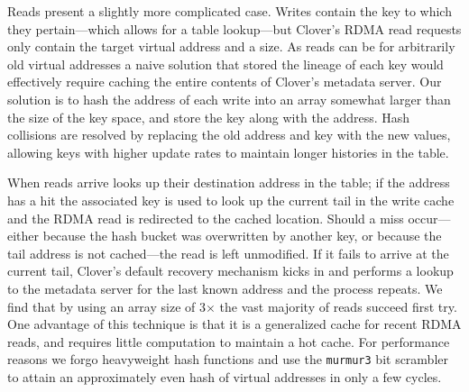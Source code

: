 Reads present a slightly more complicated case. Writes contain the key
to which they pertain---which allows for a table lookup---but Clover's
RDMA read requests only contain the target virtual address and a size.
As reads can be for arbitrarily old virtual addresses a naive solution
that stored the lineage of each key would effectively require
caching the entire contents of Clover's metadata server.  Our solution
is to hash the address of each write into an array somewhat larger than
the size of the key space, and store the key along with the address.
Hash collisions are resolved by replacing the old address and key with
the new values, allowing keys with higher update rates to maintain
longer histories in the table. 

When reads arrive {\sword} looks up their destination address in the
table; if the address has a hit the associated key is used to look up
the current tail in the write cache and the RDMA read is redirected to
the cached location.  Should a miss occur---either because the hash
bucket was overwritten by another key, or because the tail address is
not cached---the read is left unmodified.  If it fails to arrive at
the current tail, Clover's default recovery mechanism kicks in and
performs a lookup to the metadata server for the last known address
and the process repeats. We find that by using an array size of
3$\times$ the vast majority of reads succeed first try. One advantage
of this technique is that it is a generalized cache for recent RDMA
reads, and requires little computation to maintain a hot cache. For
performance reasons we forgo heavyweight hash functions and use
the \texttt{murmur3} bit scrambler to attain an approximately even
hash of virtual addresses in only a few cycles.



